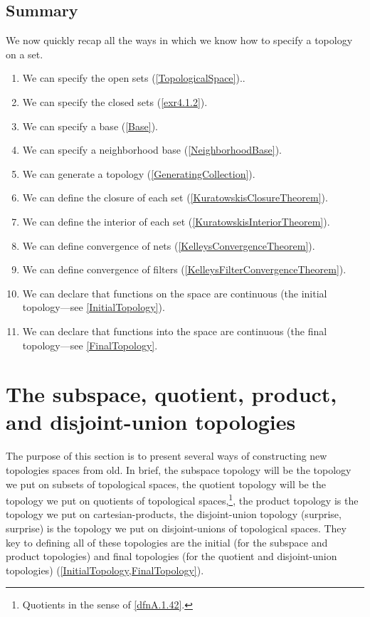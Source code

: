 \subsection{Summary}

We now quickly recap all the ways in which we know how to specify a topology on a set.
\begin{enumerate}
\item We can specify the open sets (\cref{TopologicalSpace})..
\item We can specify the closed sets (\cref{exr4.1.2}).
\item We can specify a base (\cref{Base}).
\item We can specify a neighborhood base (\cref{NeighborhoodBase}).
\item We can generate a topology (\cref{GeneratingCollection}).
\item We can define the closure of each set (\cref{KuratowskisClosureTheorem}).
\item We can define the interior of each set (\cref{KuratowskisInteriorTheorem}).
\item We can define convergence of nets (\cref{KelleysConvergenceTheorem}).
\item We can define convergence of filters (\cref{KelleysFilterConvergenceTheorem}).
\item We can declare that functions on the space are continuous (the initial topology---see \cref{InitialTopology}).
\item We can declare that functions into the space are continuous (the final topology---see \cref{FinalTopology}.
\end{enumerate}

\section{The subspace, quotient, product, and disjoint-union topologies}

The purpose of this section is to present several ways of constructing new topologies spaces from old.  In brief, the subspace topology will be the topology we put on subsets of topological spaces, the quotient topology will be the topology we put on quotients of topological spaces,\footnote{Quotients in the sense of \cref{dfnA.1.42}.}, the product topology is the topology we put on cartesian-products, the disjoint-union topology (surprise, surprise) is the topology we put on disjoint-unions of topological spaces.  They key to defining all of these topologies are the initial (for the subspace and product topologies) and final topologies (for the quotient and disjoint-union topologies) (\cref{InitialTopology,FinalTopology}).

